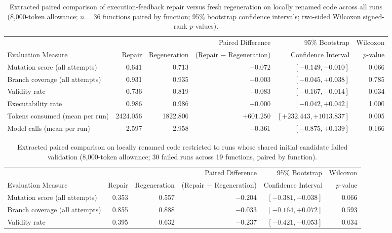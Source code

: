 \documentclass[11pt,a4paper]{article}
\begin{document}
\begin{table}[htbp]
\centering\footnotesize
\setlength{\tabcolsep}{4pt}
\caption{Extracted paired comparison of execution-feedback repair versus fresh regeneration on locally renamed code across all runs (8{,}000-token allowance; $n = 36$ functions paired by function; 95\% bootstrap confidence intervals; two-sided Wilcoxon signed-rank $p$-values).}
\label{tab:main-renamed}
\begin{tabular}{@{}lrrrrr@{}}
\toprule
 & & & Paired Difference & 95\% Bootstrap & Wilcoxon \\
Evaluation Measure & Repair & Regeneration & (Repair $-$ Regeneration) & Confidence Interval & $p$-value \\
\midrule
Mutation score (all attempts) & 0.641 & 0.713 & $-0.072$ & $[-0.149, -0.010]$ & 0.066 \\
Branch coverage (all attempts) & 0.931 & 0.935 & $-0.003$ & $[-0.045, +0.038]$ & 0.785 \\
Validity rate & 0.736 & 0.819 & $-0.083$ & $[-0.167, -0.014]$ & 0.034 \\
Executability rate & 0.986 & 0.986 & $+0.000$ & $[-0.042, +0.042]$ & 1.000 \\
Tokens consumed (mean per run) & 2424.056 & 1822.806 & $+601.250$ & $[+232.443, +1013.837]$ & 0.005 \\
Model calls (mean per run) & 2.597 & 2.958 & $-0.361$ & $[-0.875, +0.139]$ & 0.166 \\
\bottomrule
\end{tabular}
\end{table}

\begin{table}[htbp]
\centering\footnotesize
\setlength{\tabcolsep}{4pt}
\caption{Extracted paired comparison on locally renamed code restricted to runs whose shared initial candidate failed validation (8{,}000-token allowance; 30 failed runs across 19 functions, paired by function).}
\label{tab:fail-renamed}
\begin{tabular}{@{}lrrrrr@{}}
\toprule
 & & & Paired Difference & 95\% Bootstrap & Wilcoxon \\
Evaluation Measure & Repair & Regeneration & (Repair $-$ Regeneration) & Confidence Interval & $p$-value \\
\midrule
Mutation score (all attempts) & 0.353 & 0.557 & $-0.204$ & $[-0.381, -0.038]$ & 0.066 \\
Branch coverage (all attempts) & 0.855 & 0.888 & $-0.033$ & $[-0.164, +0.072]$ & 0.593 \\
Validity rate & 0.395 & 0.632 & $-0.237$ & $[-0.421, -0.053]$ & 0.034 \\
\bottomrule
\end{tabular}
\end{table}
\end{document}
